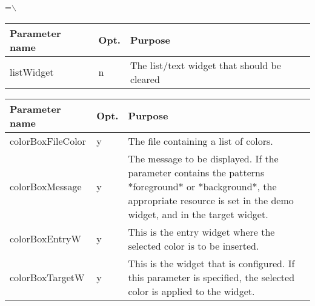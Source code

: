 {\newpage
\clearpage
\samepage \setbox\sizebox=\hbox{$\backslash$}\box\sizebox
}

{\newpage
\clearpage
\samepage \begin{figure}[ht]
  \centerline{
  \epsfysize=4.2cm
  }
  
  \label{fig:AlertBox}
\end{figure}
}

{\newpage
\clearpage
\samepage \begin{tabular}{|l|l|p{6.5cm}|} \hline
Parameter name & Opt. & Purpose \\  \hline
listWidget     & n    & The list/text widget that should be
                        cleared \\  \hline
\end{tabular}
}

{\newpage
\clearpage
\samepage \begin{tabular}{|l|l|p{6.7cm}|} \hline
Parameter name    & Opt. & Purpose\\  \hline
colorBoxFileColor & y    & The file containing a list of
                           colors.\\  \hline
colorBoxMessage   & y    & The message to be displayed. If
                           the parameter contains the
                           patterns *foreground* or
                           *background*, the appropriate
                           resource is set in the demo
                           widget, and in the target
                           widget.\\  \hline
colorBoxEntryW    & y    & This is the entry widget where
                           the selected color is to be
                           inserted.\\  \hline
colorBoxTargetW   & y    & This is the widget that is
                           configured. If this parameter is
                           specified, the selected color is
                           applied to the widget.\\  \hline
\end{tabular}
}

